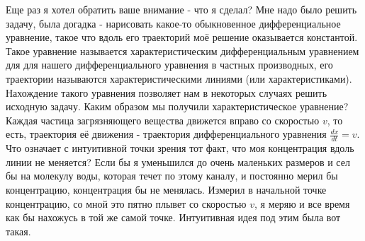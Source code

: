
Еще раз я хотел обратить ваше внимание - что я сделал? Мне надо было решить задачу, была догадка - нарисовать какое-то обыкновенное дифференциальное уравнение, такое что вдоль его траекторий моё решение оказывается константой. Такое уравнение называется характеристическим дифференциальным уравнением для для нашего дифференциального уравнения в частных производных, его траектории называются характеристическими линиями (или характеристиками). Нахождение такого уравнения позволяет нам в некоторых случаях решить исходную задачу.
Каким образом мы получили характеристическое уравнение? Каждая частица загрязняющего вещества движется вправо со скоростью $v$, то есть, траектория её движения - траектория дифференциального уравнения $\frac{dx}{dt} = v$. Что означает с интуитивной точки зрения тот факт, что моя концентрация вдоль линии не меняется? Если бы я уменьшился до очень маленьких размеров и сел бы на молекулу воды, которая течет по этому каналу, и постоянно мерил бы концентрацию, концентрация бы не менялась. Измерил в начальной точке концентрацию, со мной это пятно плывет со скоростью $v$, я меряю и все время как бы нахожусь в той же самой точке. Интуитивная идея под этим была вот такая.

